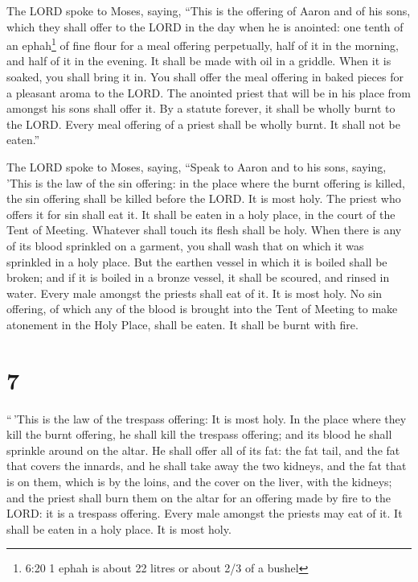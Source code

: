  The LORD spoke to Moses, saying,  ``This is
the offering of Aaron and of his sons, which they shall offer to the
LORD in the day when he is anointed: one tenth of an ephah\footnote{6:20
  1 ephah is about 22 litres or about 2/3 of a bushel} of fine flour for
a meal offering perpetually, half of it in the morning, and half of it
in the evening.  It shall be made with oil in a griddle.
When it is soaked, you shall bring it in. You shall offer the meal
offering in baked pieces for a pleasant aroma to the LORD. 
The anointed priest that will be in his place from amongst his sons
shall offer it. By a statute forever, it shall be wholly burnt to the
LORD.  Every meal offering of a priest shall be wholly
burnt. It shall not be eaten.''

 The LORD spoke to Moses, saying,  ``Speak to
Aaron and to his sons, saying, 'This is the law of the sin offering: in
the place where the burnt offering is killed, the sin offering shall be
killed before the LORD. It is most holy.  The priest who
offers it for sin shall eat it. It shall be eaten in a holy place, in
the court of the Tent of Meeting.  Whatever shall touch its
flesh shall be holy. When there is any of its blood sprinkled on a
garment, you shall wash that on which it was sprinkled in a holy place.
 But the earthen vessel in which it is boiled shall be
broken; and if it is boiled in a bronze vessel, it shall be scoured, and
rinsed in water.  Every male amongst the priests shall eat
of it. It is most holy.  No sin offering, of which any of
the blood is brought into the Tent of Meeting to make atonement in the
Holy Place, shall be eaten. It shall be burnt with fire.

\hypertarget{section-6}{%
\section{7}\label{section-6}}

 ``\,'This is the law of the trespass offering: It is most
holy.  In the place where they kill the burnt offering, he
shall kill the trespass offering; and its blood he shall sprinkle around
on the altar.  He shall offer all of its fat: the fat tail,
and the fat that covers the innards,  and he shall take away
the two kidneys, and the fat that is on them, which is by the loins, and
the cover on the liver, with the kidneys;  and the priest
shall burn them on the altar for an offering made by fire to the LORD:
it is a trespass offering.  Every male amongst the priests
may eat of it. It shall be eaten in a holy place. It is most holy.

